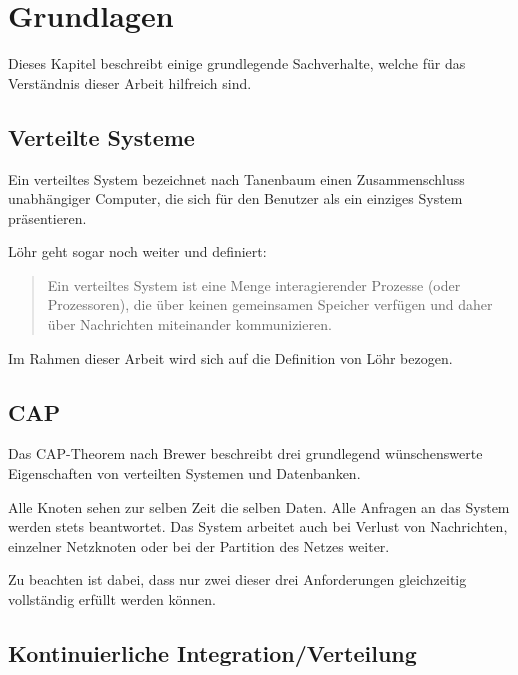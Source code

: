 \chapter{Grundlagen}
\label{chap:base}
Dieses Kapitel beschreibt einige grundlegende Sachverhalte,
welche für das Verständnis dieser Arbeit hilfreich sind.

\section{Verteilte Systeme}
\label{sec:base:vs}

Ein verteiltes System bezeichnet nach Tanenbaum \cite{tanenbaum:vs}
einen Zusammenschluss unabhängiger Computer, die sich für den Benutzer als ein einziges System präsentieren.

L\"ohr geht sogar noch weiter und definiert:
\begin{quotation}
    Ein verteiltes System ist eine Menge
    interagierender Prozesse (oder Prozessoren),
    die über keinen gemeinsamen Speicher verfügen
    und daher über Nachrichten miteinander kommunizieren. \cite{loehr:vs}
\end{quotation}

Im Rahmen dieser Arbeit wird sich auf die Definition von L\"ohr bezogen.

\section{CAP}
\label{sec:base:cap}
Das \ac{CAP}-Theorem nach Brewer \cite{brewer:cap} beschreibt drei grundlegend
wünschenswerte Eigenschaften von verteilten Systemen und Datenbanken.

\begin{itemize}
  \dhitem[Konsistenz (C)]
      Alle Knoten sehen zur selben Zeit die selben Daten. 
  \dhitem[Verfügbarkeit (A)]
      Alle Anfragen an das System werden stets beantwortet.
  \dhitem[Partitionstoleranz (P)]
      Das System arbeitet auch bei Verlust von Nachrichten,
      einzelner Netzknoten oder bei der Partition des Netzes weiter.
\end{itemize}

Zu beachten ist dabei, dass nur zwei dieser drei Anforderungen gleichzeitig
vollständig erfüllt werden können.

\section{Kontinuierliche Integration/Verteilung}
\label{sec:base:ci}

